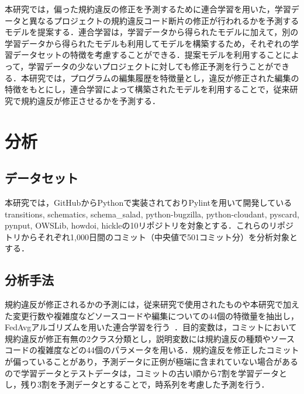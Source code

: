 \documentclass[uplatex,dvipdfmx,a4paper,twocolumn,base=11pt,jbase=11pt,ja=standard]{bxjsarticle}  %
\begin{document}
本研究では，偏った規約違反の修正を予測するために連合学習を用いた，学習データと異なるプロジェクトの規約違反コード断片の修正が行われるかを予測するモデルを提案する．連合学習は，学習データから得られたモデルに加えて，別の学習データから得られたモデルも利用してモデルを構築するため，それぞれの学習データセットの特徴を考慮することができる．提案モデルを利用することによって，学習データの少ないプロジェクトに対しても修正予測を行うことができる．本研究では，プログラムの編集履歴を特徴量とし，違反が修正された編集の特徴をもとにし，連合学習によって構築されたモデルを利用することで，従来研究で規約違反が修正させるかを予測する．

\section{分析}







\subsection{データセット}
本研究では，GitHubからPythonで実装されておりPylintを用いて開発しているtransitions, schematics, schema\_salad, python-bugzilla, python-cloudant, pyscard, pynput, OWSLib, howdoi, hickleの10リポジトリを対象とする．これらのリポジトリからそれぞれ1,000日間のコミット（中央値で501コミット分）を分析対象とする．

\subsection{分析手法}
規約違反が修正されるかの予測には，従来研究で使用されたものや本研究で加えた変更行数や複雑度などソースコードや編集についての44個の特徴量を抽出し，FedAvgアルゴリズムを用いた連合学習を行う~\cite{article2}．目的変数は，コミットにおいて規約違反が修正有無の2クラス分類とし，説明変数には規約違反の種類やソースコードの複雑度などの44個のパラメータを用いる．規約違反を修正したコミットが偏っていることがあり，予測データに正例が極端に含まれていない場合があるので学習データとテストデータは，コミットの古い順から7割を学習データとし，残り3割を予測データとすることで，時系列を考慮した予測を行う．
\end{document}
